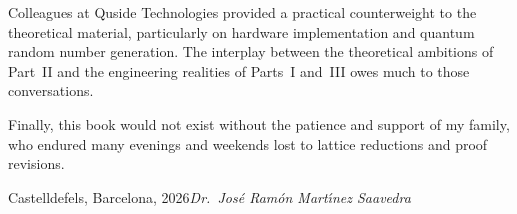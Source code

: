 Colleagues at Quside Technologies provided a practical counterweight to the theoretical material, particularly on hardware implementation and quantum random number generation.  The interplay between the theoretical ambitions of Part~II and the engineering realities of Parts~I and~III owes much to those conversations.


Finally, this book would not exist without the patience and support of my family, who endured many evenings and weekends lost to lattice reductions and proof revisions.

\vspace{\baselineskip}
\begin{flushright}\noindent
Castelldefels, Barcelona, 2026\hfill {\it Dr.\ Jos\'{e} Ram\'{o}n Mart\'{\i}nez Saavedra}
\end{flushright}
